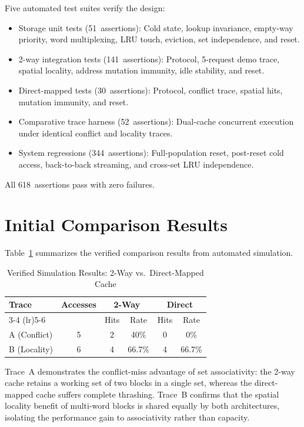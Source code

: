 \documentclass[conference]{IEEEtran}
\begin{document}
Five automated test suites verify the design:
\begin{itemize}
  \item Storage unit tests (51~assertions): Cold state, lookup invariance, empty-way priority, word multiplexing, LRU touch, eviction, set independence, and reset.
  \item 2-way integration tests (141~assertions): Protocol, 5-request demo trace, spatial locality, address mutation immunity, idle stability, and reset.
  \item Direct-mapped tests (30~assertions): Protocol, conflict trace, spatial hits, mutation immunity, and reset.
  \item Comparative trace harness (52~assertions): Dual-cache concurrent execution under identical conflict and locality traces.
  \item System regressions (344~assertions): Full-population reset, post-reset cold access, back-to-back streaming, and cross-set LRU independence.
\end{itemize}

All 618~assertions pass with zero failures.

\section{Initial Comparison Results}

Table~\ref{tab:comparison} summarizes the verified comparison results from automated simulation.

\begin{table}[ht]
\centering
\caption{Verified Simulation Results: 2-Way vs.\ Direct-Mapped Cache}
\label{tab:comparison}
\begin{tabular}{@{}lccccc@{}}
\toprule
\textbf{Trace} & \textbf{Accesses} & \multicolumn{2}{c}{\textbf{2-Way}} & \multicolumn{2}{c}{\textbf{Direct}} \\
\cmidrule(lr){3-4} \cmidrule(lr){5-6}
 & & Hits & Rate & Hits & Rate \\
\midrule
A (Conflict)  & 5 & 2 & 40\%   & 0 & 0\%  \\
B (Locality)  & 6 & 4 & 66.7\% & 4 & 66.7\% \\
\bottomrule
\end{tabular}
\end{table}

Trace~A demonstrates the conflict-miss advantage of set associativity: the 2-way cache retains a working set of two blocks in a single set, whereas the direct-mapped cache suffers complete thrashing.  Trace~B confirms that the spatial locality benefit of multi-word blocks is shared equally by both architectures, isolating the performance gain to associativity rather than capacity.
\end{document}

